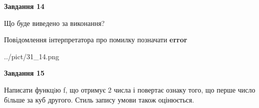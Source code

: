 \documentclass[11pt, ukrainian]{article}
\begin{document}
{\begin {large}
{\begin {center}\textbf{Завдання 14}\end {center}}\par
Що буде виведено за виконання? \par
Повідомлення інтерпретатора про помилку позначати \textbf{error}

\begin{center}
	{../pict/31_14.png}
\end{center}
\newpage

{\begin {center}\textbf{Завдання 15}\end {center}}\par

Написати функцiю f, що отримує 2 числа і повертає ознаку того, що перше число бiльше за куб другого. Стиль запису умови також оцінюється.\par
\newpage

\end {large}}
\end{document}
